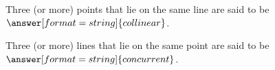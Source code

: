 \documentclass[nooutcomes]{ximera}
\begin{document}
\begin{question}  
Three (or more) points that lie on the same line are said to be $\answer[format=string]{collinear}$.  
\end{question}

\begin{question}  
Three (or more) lines that lie on the same point are said to be $\answer[format=string]{concurrent}$.  
\end{question}

%

\end{document}
